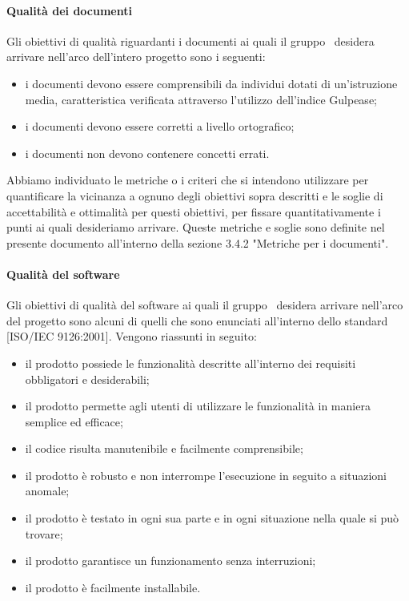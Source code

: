 \documentclass[../PianoDiQualifica.tex]{subfiles}
\begin{document}
			\paragraph{Qualità dei documenti}
			Gli obiettivi di qualità riguardanti i documenti ai quali il gruppo \leaf\ desidera arrivare nell'arco dell'intero progetto sono i seguenti:
			\begin{itemize}
				\item i documenti devono essere comprensibili da individui dotati di un'istruzione media, caratteristica verificata attraverso l'utilizzo dell'indice Gulpease;
				\item i documenti devono essere corretti a livello ortografico;
				\item i documenti non devono contenere concetti errati.
			\end{itemize}
			Abbiamo individuato le metriche o i criteri che si intendono utilizzare per quantificare la vicinanza a ognuno degli obiettivi sopra descritti e le soglie di accettabilità e ottimalità per questi obiettivi, per fissare quantitativamente i punti ai quali desideriamo arrivare. Queste metriche e soglie sono definite nel presente documento all'interno della sezione 3.4.2 "Metriche per i documenti".
			\paragraph{Qualità del software}
			Gli obiettivi di qualità del software ai quali il gruppo \leaf\ desidera arrivare nell'arco del progetto sono alcuni di quelli che sono enunciati all'interno dello standard [ISO/IEC 9126:2001]. Vengono riassunti in seguito:
			\begin{itemize}
				\item il prodotto possiede le funzionalità descritte all'interno dei requisiti obbligatori e desiderabili;
				\item il prodotto permette agli utenti di utilizzare le funzionalità in maniera semplice ed efficace;
				\item il codice risulta manutenibile e facilmente comprensibile;
				\item il prodotto è robusto e non interrompe l'esecuzione in seguito a situazioni anomale;
				\item il prodotto è testato in ogni sua parte e in ogni situazione nella quale si può trovare;
				\item il prodotto garantisce un funzionamento senza interruzioni;
				\item il prodotto è facilmente installabile.
			\end{itemize}
\end{document}
